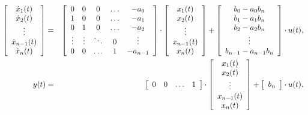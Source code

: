 \begin{eqnarray*}
\left [ 
\begin{array}{c}
\dot{x}_1(t)\\
\dot{x}_2(t)\\
\vdots\\
\dot{x}_{n-1}(t)\\
\dot{x}_n(t)\\
\end{array}
\right ] &=&
\left [ 
\begin{array}{c c c c c}
0 & 0 & 0 & \ldots & -a_0\\
1 & 0 & 0 & \ldots & -a_1\\
0 & 1 & 0 & \ldots & -a_2\\
\vdots & \vdots &  \ddots & 0 & \vdots\\
0 & 0 & \ldots & 1 & -a_{n-1}\\

\end{array}
\right ]\cdot
\left [ 
\begin{array}{c}
x_1(t)\\
x_2(t)\\
\vdots \\
x_{n-1}(t)\\
x_{n}(t)\\
\end{array}
\right ]+
\left [ 
\begin{array}{c}
b_0-a_0b_n \\
b_1-a_1b_n\\
b_2-a_2b_n\\
\vdots\\
b_{n-1}-a_{n-1}b_n\\
\end{array}
\right ]\cdot
u(t),\\
y(t) &= &
\left [ 
\begin{array}{c c c c}
0 & 0 & \ldots & 1\\
\end{array}
\right ] \cdot
\left [ 
\begin{array}{c}
x_1(t)\\
x_2(t)\\
\vdots \\
x_{n-1}(t)\\
x_{n}(t)\\
\end{array}
\right ]+
\left [ 
\begin{array}{c}
b_n \\
\end{array}
\right ] \cdot
u(t).
\end{eqnarray*}

